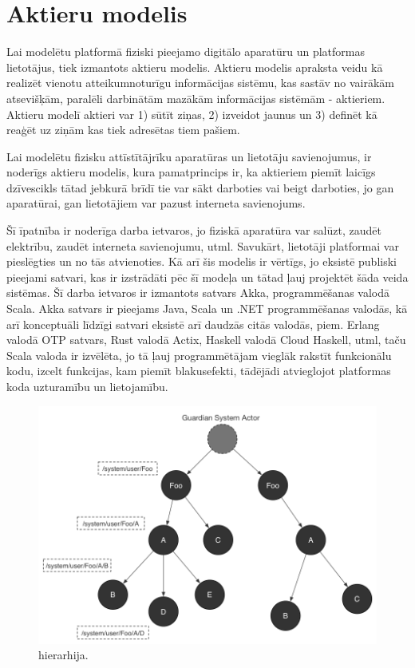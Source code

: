 \section{Aktieru modelis}
\label{sec:actormodel}

Lai modelētu platformā fiziski pieejamo digitālo aparatūru un platformas
lietotājus, tiek izmantots aktieru modelis. Aktieru modelis apraksta veidu kā
realizēt vienotu atteikumnoturīgu informācijas sistēmu, kas sastāv no vairākām
atsevišķām, paralēli darbinātām mazākām informācijas sistēmām - aktieriem.
Aktieru modelī aktieri var 1) sūtīt ziņas, 2) izveidot jaunus
 un 3) definēt kā reaģēt uz ziņām kas tiek adresētas
tiem pašiem. \cite[p. 1]{CarlHewitt2010}

Lai modelētu fizisku attīstītājrīku aparatūras un lietotāju savienojumus, ir
noderīgs aktieru modelis, kura pamatprincips ir, ka aktieriem piemīt laicīgs
dzīvescikls tātad jebkurā brīdī tie var sākt darboties vai beigt darboties, jo
gan aparatūrai, gan lietotājiem var pazust interneta savienojums.
\cite[p. 6]{CarlHewitt2010} 
 
Šī īpatnība ir noderīga darba ietvaros, jo fiziskā aparatūra var salūzt, zaudēt
elektrību, zaudēt interneta savienojumu, utml. Savukārt, lietotāji platformai
var pieslēgties un no tās atvienoties. Kā arī šis modelis ir vērtīgs, jo eksistē
publiski pieejami satvari, kas ir izstrādāti pēc šī modeļa un tātad ļauj
projektēt šāda veida sistēmas. Šī darba ietvaros ir izmantots satvars Akka,
programmēšanas valodā Scala. Akka satvars ir pieejams Java, Scala un .NET
programmēšanas valodās, kā arī konceptuāli līdzīgi satvari eksistē arī daudzās
citās valodās, piem. Erlang valodā OTP satvars, Rust valodā Actix, Haskell
valodā Cloud Haskell, utml, taču Scala valoda ir izvēlēta, jo tā ļauj
programmētājam vieglāk rakstīt funkcionālu kodu, izcelt funkcijas, kam piemīt
blakusefekti, tādējādi atvieglojot platformas koda uzturamību un lietojamību. 

\begin{figure}[H]
    \includegraphics[width=0.5\linewidth]{assets/akka-actor-hierarchy-gray.png}
    \centering
    \caption{ hierarhija.
    \cite[sl. 34]{MarkusJuraAkka}}
    \label{fig:actorsystem}
\end{figure}

